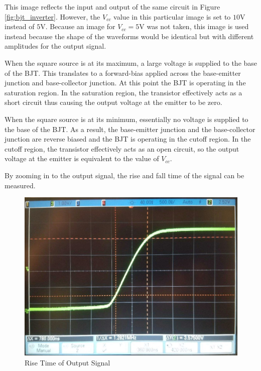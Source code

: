 {\footnotesize This image reflects the input and output of the same circuit in Figure \ref{fig:bjt_inverter}. However, the $V_{cc}$ value in this particular image is set to $10$\si{\volt} instead of $5$\si{\volt}. Because an image for $V_{cc} = 5$\si{\volt} was not taken, this image is used instead because the shape of the waveforms would be identical but with different amplitudes for the output signal.}

\FloatBarrier

When the square source is at its maximum, a large voltage is supplied to the base of the BJT. This translates to a forward-bias applied across the base-emitter junction and base-collector junction. At this point the BJT is operating in the saturation region. In the saturation region, the transistor effectively acts as a short circuit thus causing the output voltage at the emitter to be zero.

When the square source is at its minimum, essentially no voltage is supplied to the base of the BJT. As a result, the base-emitter junction and the base-collector junction are reverse biased and the BJT is operating in the cutoff region. In the cutoff region, the transistor effectively acts as an open circuit, so the output voltage at the emitter is equivalent to the value of $V_{cc}$.

By zooming in to the output signal, the rise and fall time of the signal can be measured.

\FloatBarrier
\begin{figure}[h!]
	\centering
	\includegraphics[scale=0.24]{../images/inverter_tr.jpeg}
	\caption{Rise Time of Output Signal}
	\label{fig:inverter_tr}
\end{figure}
\FloatBarrier


